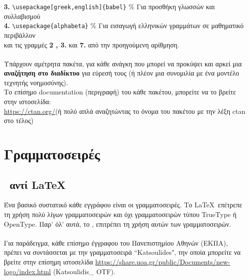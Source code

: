 \documentclass[a4paper, 12pt, oneside, xelatex, final]{article}
\begin{document}
	\textbf{3.} \verb+\usepackage[greek,english]{babel}+ \% Για προσθήκη γλωσσών και συλλαβισμού\\
	\textbf{4.} \verb+\usepackage{alphabeta}+  \% Για εισαγωγή ελληνικών γραμμάτων σε μαθηματικό περιβάλλον\\
	και τις γραμμές \textbf{2 , 3.} και \textbf{7.} από την προηγούμενη αρίθμηση.\\ \\
	Υπάρχουν αμέτρητα πακέτα, για κάθε ανάγκη που μπορεί να προκύψει και αρκεί μια \textbf{αναζήτηση στο διαδίκτυο} για εύρεσή τους (ή πλέον μια συνομιλία με ένα μοντέλο τεχνητής νοημοσύνης).\\
	Το επίσημο documentation (περιγραφή) του κάθε πακέτου, μπορείτε να το βρείτε στην ιστοσελίδα:\\ \url{https://ctan.org/}\qquad (ή πολύ απλά αναζητώντας το όνομα του πακέτου με την λέξη ctan στο τέλος)
\section{Γραμματοσειρές}
\label{Fonts}
	\subsection{\XeLaTeX\ αντί \LaTeX}
	\noindent Ένα βασικό συστατικό κάθε εγγράφου είναι οι γραμματοσειρές. Το \LaTeX\ επέτρεπε τη χρήση πολύ λίγων γραμματοσειρών και όχι γραμματοσειρών τύπου TrueType ή OpenType. Παρ' όλ' αυτά, το \XeLaTeX, επιτρέπει τη χρήση αυτών των γραμματοσειρών.\\ \\
	Για παράδειγμα, κάθε επίσημο έγγραφου του Πανεπιστημίου Αθηνών (ΕΚΠΑ), πρέπει να συντάσσεται με την γραμματοσειρά ``Katsoulides", την οποία μπορείτε να βρείτε στην επίσημη ιστοσελίδα \url{https://share.uoa.gr/public/Documents/new-logo/index.html}\; (Katsoulidis\_ OTF).
\end{document}
